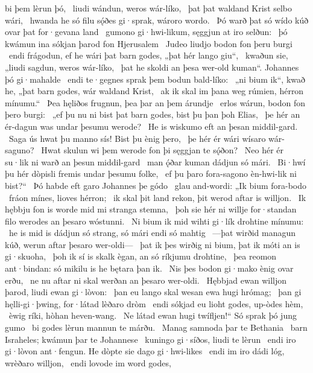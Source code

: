 bi þem lèrun þó, \hld\ liudi wándun,
weros wár-líko, \hld\ þat þat waldand Krist
selbo wári, \hld\ hwanda he só filu sǫ́ðes gi·sprak,
wároro wordo. \hld\ Þó warð þat só wído kúð
ovar þat for·gevana land \hld\ gumono gi·hwi-likum,
sęggjun at iro selðun: \hld\ þó kwámun ina sókjan þarod
fon Hjerusalem \hld\ Judeo liudjo
bodon fon þeru burgi \hld\ endi frágodun, ef he wári þat barn godes,
„þat hér lango giu“, \hld\ kwaðun sie, „liudi sagdun,
weros wár-líko, \hld\ þat he skoldi an þesa wer-old kuman“.
Johannes þó gi·mahalde \hld\ endi te·gegnes sprak
þem bodun bald-líko: \hld\ „ni bium ik“, kwað he, „þat barn godes,
wár waldand Krist, \hld\ ak ik skal im þana weg rúmien,
hérron mínumu.“ \hld\ Þea hęliðos frugnun,
þea þar an þem árundje \hld\ erlos wárun,
bodon fon þero burgi: \hld\ „ef þu nu ni bist þat barn godes,
bist þu þan þoh Elias, \hld\ þe hér an ér-dagun
was undar þesumu werode? \hld\ He is wiskumo
eft an þesan middil-gard. \hld\ Saga ús hwat þu manno sís!
Bist þu ènig þero, \hld\ þe hér ér wári
wísaro wár-saguno? \hld\ Hwat skulun wi þem werode fon þi
sęggjan te sǫ́ðon? \hld\ Neo hér ér su·lik ni warð
an þesun middil-gard \hld\ man ǫ́ðar kuman
dádjun só mári. \hld\ Bi·hwí þu hér dòpisli
fremis undar þesumu folke, \hld\ ef þu þaro fora-sagono
èn-hwi-lik ni bist?“ \hld\ Þó habde eft garo
Johannes þe gódo \hld\ glau and-wordi:
„Ik bium fora-bodo \hld\ fráon mínes,
lioves hérron; \hld\ ik skal þit land rekon,
þit werod aftar is willjon. \hld\ Ik hębbju fon is worde mid mi
stranga stemna, \hld\ þoh sie hér ni willje for·standan filo
werodes an þesaro wóstunni. \hld\ Ni bium ik mid wihti gi·lík
drohtine mínumu: \hld\ he is mid is dádjun só strang,
só mári endi só mahtig \hld\ —þat wirðid managun kúð,
werun aftar þesaro wer-oldi— \hld\ þat ik þes wirðig ni bium,
þat ik móti an is gi·skuoha, \hld\ þoh ik sí is skalk ègan,
an só ríkjumu drohtine, \hld\ þea reomon ant·bindan:
só mikilu is he bętara þan ik. \hld\ Nis þes bodon gi·mako
ènig ovar erðu, \hld\ ne nu aftar ni skal
werðan an þesaro wer-oldi. \hld\ Hębbjad ewan willjon þarod,
liudi ewan gi·lòvon: \hld\ þan eu lango skal
wesan ewa hugi hrómag; \hld\ þan gi hęlli-gi·þwing,
for·látad lèðaro dròm \hld\ endi sókjad eu lioht godes,
up-òdes hèm, \hld\ èwig ríki,
hòhan heven-wang. \hld\ Ne látad ewan hugi twífljen!“
Só sprak þó jung gumo \hld\ bi godes lèrun
mannun te márðu. \hld\ Manag samnoda
þar te Bethania \hld\ barn Israheles;
kwámun þar te Johannese \hld\ kuningo gi·síðos,
liudi te lèrun \hld\ endi iro gi·lòvon ant·fengun.
He dòpte sie dago gi·hwi-likes \hld\ endi im iro dádi lóg,
wrèðaro willjon, \hld\ endi lovode im word godes,
